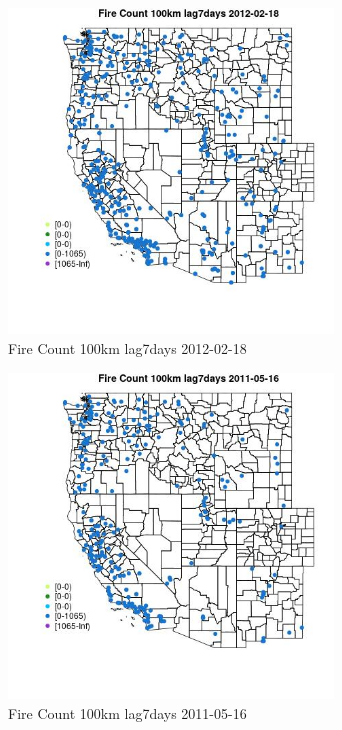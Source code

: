 \begin{figure} 
\centering  
\includegraphics[width=0.77\textwidth]{Code_Outputs/Report_ML_input_PM25_Step4_part_f_de_duplicated_aves_prioritize_24hr_obswNAs_MapObsFire_Count_100km_lag7days2012-02-18.jpg} 
\caption{\label{fig:Report_ML_input_PM25_Step4_part_f_de_duplicated_aves_prioritize_24hr_obswNAsMapObsFire_Count_100km_lag7days2012-02-18}Fire Count 100km lag7days 2012-02-18} 
\end{figure} 
 

\clearpage 

\begin{figure} 
\centering  
\includegraphics[width=0.77\textwidth]{Code_Outputs/Report_ML_input_PM25_Step4_part_f_de_duplicated_aves_prioritize_24hr_obswNAs_MapObsFire_Count_100km_lag7days2011-05-16.jpg} 
\caption{\label{fig:Report_ML_input_PM25_Step4_part_f_de_duplicated_aves_prioritize_24hr_obswNAsMapObsFire_Count_100km_lag7days2011-05-16}Fire Count 100km lag7days 2011-05-16} 
\end{figure} 
 

